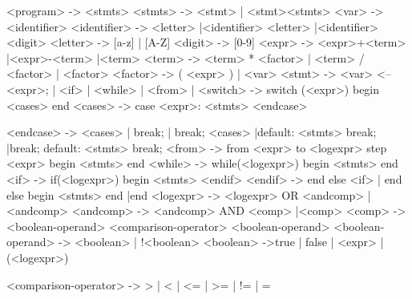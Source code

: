 <program> -> <stmts>
<stmts> -> <stmt>
	| <stmt><stmts>
<var> -> <identifier>
<identifier> -> <letter>
	|<identifier> <letter>
	|<identifier> <digit>
<letter> -> [a-z]
	| [A-Z]
<digit> -> [0-9]
<expr> -> <expr>+<term>
	|<expr>-<term>
	|<term>
<term> -> <term> * <factor>
	| <term> / <factor>
	| <factor>
<factor> -> ( <expr> )
	| <var>
<stmt> -> <var> <-- <expr>;
	| <if>
	| <while>
	| <from>
	|
<switch> -> switch (<expr>)
		begin
			<cases>
		end
<cases> -> case <expr>:
			<stmts>
		<endcase>
		
<endcase> -> <cases>
		| break;
		| break;
		<cases>
		|default:
			<stmts>
			break;
		|break;
		default:
			<stmts>
			break;
<from> -> from <expr> to <logexpr> step <expr>
	begin
		<stmts>
	end 
<while> -> while(<logexpr>)
		begin
			<stmts>
		end
<if> -> if(<logexpr>)
	begin
		<stmts>
	<endif>
<endif> -> end
	else <if>
	| end
	else
	begin
		<stmts>
	end
	|end
<logexpr> -> <logexpr> OR <andcomp>
		| <andcomp>
<andcomp> -> <andcomp> AND <comp>
		|<comp>
<comp> -> <boolean-operand> <comparison-operator> <boolean-operand>
<boolean-operand> -> <boolean>
		| !<boolean>
<boolean> ->true
		| false
		| <expr>
		| (<logexpr>)

<comparison-operator> -> >
				| <
				| <=
				| >=
				| !=
				| =